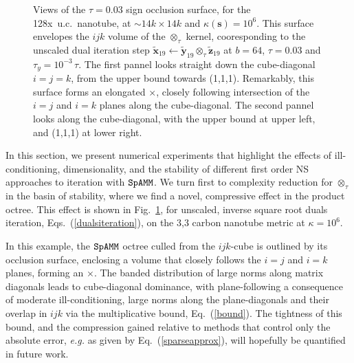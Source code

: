 \documentclass[letterpaper,twocolumn,amsmath,amsfont,amssymb,english,aps,jcp,preprintnumbers,groupaddress,nofootinbib,tightenlines]{revtex4}
\newcommand{\mat}[1]{\boldsymbol{#1}}
\newcommand{\mmat}[1]{\widetilde{\boldsymbol{#1}}}
\newcommand{\ot}{ {\scriptstyle \otimes}_{ \tau } }
\begin{document}
 \begin{figure}[h] \label{markofzorro}
 \caption{Views of the $\tau =0.03$ sign occlusion surface, for the
 128x~u.c.~nanotube, at $\sim {14k \times 14k}$ and $\kappa(\mat{s})=10^6$.
 This surface envelopes the $ijk$ volume of the $\ot$ kernel,
 cooresponding to the unscaled dual iteration step $\mmat{x}_{19} \leftarrow \mmat{y}_{19} \ot \mmat{z}_{19} $ at $b=64$, $\tau=0.03$ and
 $\tau_y=10^{-3} \, \tau $.  The first pannel looks straight down the cube-diagonal $i=j=k$, from the upper bound towards (1,1,1).
 Remarkably, this surface forms an elongated $\times$, closely following intersection of the $i=j$  and $i=k$ planes
 along the cube-diagonal. The second pannel looks along the cube-diagonal, with the upper bound at upper left, and (1,1,1) at lower right.}
 \end{figure}

In this section, we present  numerical experiments that highlight the effects of
ill-conditioning, dimensionality, and the stability of different first order NS approaches to iteration with $\tt SpAMM$.
We turn first to complexity reduction for $\ot$ in the basin of stability,  where we find a novel, compressive
effect in the product octree.  This effect is shown in Fig.~\ref{markofzorro},
for unscaled, inverse square root duals iteration, Eqs.~(\ref{dualsiteration}), on the 3,3 carbon
nanotube metric at $\kappa=10^6$.

In this example, the $\tt SpAMM$ octree culled from the $ijk$-cube is outlined by its occlusion surface, enclosing
a volume that closely follows the $i=j$ and $i=k$ planes, forming an $\times$.  The banded distribution
of large norms along  matrix diagonals leads to cube-diagonal dominance, with plane-following
a consequence of moderate ill-conditioning,  large norms along the plane-diagonals and their overlap in $ijk$
via the multiplicative bound, Eq.~(\ref{bound}). The tightness of this bound, and the compression gained relative
to  methods that control only the absolute error, {\em e.g.} as given by Eq.~(\ref{sparseapprox}), will hopefully
be quantified in future work.
\end{document}
